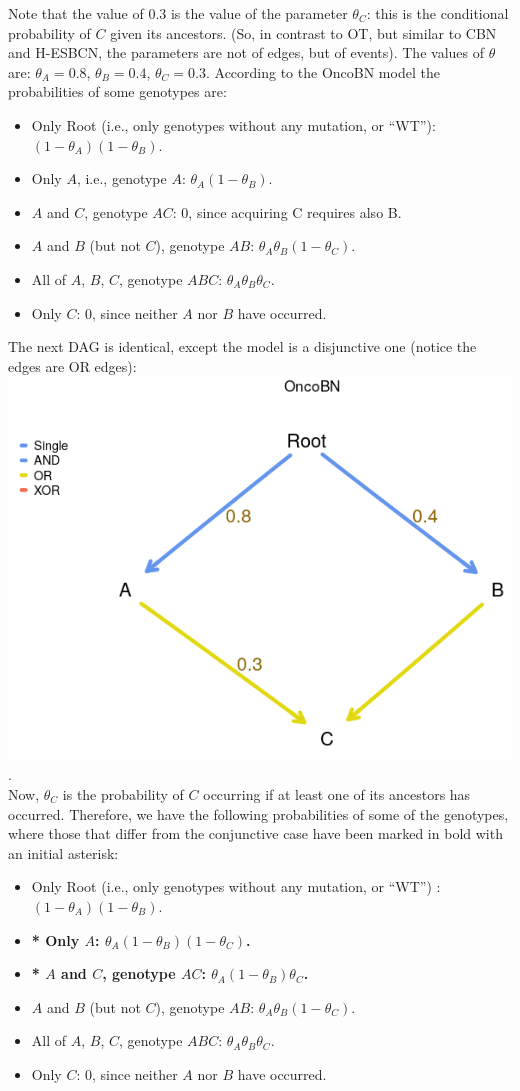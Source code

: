 \documentclass[a4paper,11pt]{article}
\begin{document}
Note that the value of 0.3 is the value of the parameter $\theta_C$: this is the conditional probability of $C$ given its ancestors. (So, in contrast to OT, but similar to CBN and H-ESBCN, the parameters are not of edges, but of events). The values of $\theta$ are: $\theta_A = 0.8$, $\theta_B = 0.4$, $\theta_C = 0.3$. According to the OncoBN model the probabilities of some genotypes are:

\begin{itemize}
\item Only Root (i.e., only genotypes without any mutation, or ``WT''): $(1 - \theta_A) (1 - \theta_B)$.
\item Only $A$, i.e., genotype $A$: $\theta_A (1 - \theta_B)$.
\item $A$ and $C$, genotype $AC$: 0, since acquiring C requires also B.
\item $A$ and $B$ (but not $C$), genotype $AB$: $\theta_A \theta_B (1 - \theta_C)$.
\item All of $A$, $B$, $C$, genotype $ABC$:  $\theta_A \theta_B \theta_C$.
\item Only $C$: 0, since neither $A$ nor $B$ have occurred.
\end{itemize}


The next DAG is identical, except the model is a disjunctive one (notice the edges are OR edges):\\

\includegraphics[width=.45\linewidth]{./oncobn_d1.png}.\\

Now, $\theta_C$ is the probability of $C$ occurring if at least one of its ancestors has occurred. Therefore, we have the following probabilities of some of the genotypes, where those that differ from the conjunctive case have been marked in bold with an initial asterisk:

\begin{itemize}
\item Only Root (i.e., only genotypes without any mutation, or ``WT'') : $(1 - \theta_A) (1 - \theta_B)$.
\item \textbf{* Only $A$: $\theta_A (1 - \theta_B) (1 - \theta_C)$.}
\item \textbf{* $A$ and $C$, genotype $AC$: $\theta_A (1 - \theta_B) \theta_C$.}
\item $A$ and $B$ (but not $C$), genotype $AB$: $\theta_A \theta_B (1 - \theta_C)$.
\item All of $A$, $B$, $C$, genotype $ABC$:  $\theta_A \theta_B \theta_C$.
\item Only $C$: 0, since neither $A$ nor $B$ have occurred.
\end{itemize}
\end{document}
